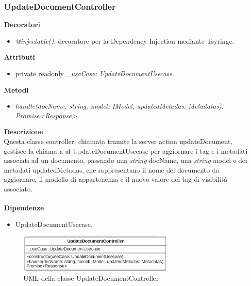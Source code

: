 \subsubsection{UpdateDocumentController}
\textbf{Decoratori}
\begin{itemize}
    \item \textit{@injectable()}: decoratore per la Dependency Injection mediante Tsyringe.
\end{itemize}
\textbf{Attributi}
\begin{itemize}
    \item private readonly \textit{\_useCase: UpdateDocumentUsecase}.
\end{itemize}
\textbf{Metodi}
\begin{itemize}
    \item \textit{handle(docName: string, model: IModel, updatedMetadas: Metadatas): Promise<Response>}.
\end{itemize}
\textbf{Descrizione}\\
Questa classe controller, chiamata tramite la server action updateDocument, gestisce la chiamata al UpdateDocumentUsecase per aggiornare i tag e i metadati associati ad un documento, passando una \textit{string} docName, una \textit{string} model e dei metadati updatedMetadas, che rappresentano il nome del documento da aggiornare, il modello di appartenenza e il nuovo valore del tag di visibilità associato.\\ \\
\textbf{Dipendenze}
\begin{itemize}
    \item UpdateDocumentUsecase.
\end{itemize}

\begin{figure}[h!]
    \centering  
    \includegraphics[width=0.7\textwidth]{UpdateDocumentController.png}
    \caption{UML della classe UpdateDocumentController}
\end{figure}

